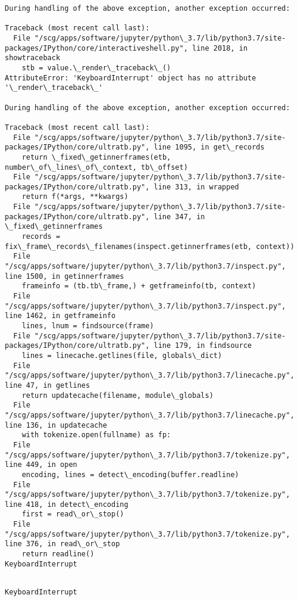 \documentclass[11pt]{article}
\begin{document}
\begin{Verbatim}[commandchars=\\\{\}]
During handling of the above exception, another exception occurred:

Traceback (most recent call last):
  File "/scg/apps/software/jupyter/python\_3.7/lib/python3.7/site-packages/IPython/core/interactiveshell.py", line 2018, in showtraceback
    stb = value.\_render\_traceback\_()
AttributeError: 'KeyboardInterrupt' object has no attribute '\_render\_traceback\_'

During handling of the above exception, another exception occurred:

Traceback (most recent call last):
  File "/scg/apps/software/jupyter/python\_3.7/lib/python3.7/site-packages/IPython/core/ultratb.py", line 1095, in get\_records
    return \_fixed\_getinnerframes(etb, number\_of\_lines\_of\_context, tb\_offset)
  File "/scg/apps/software/jupyter/python\_3.7/lib/python3.7/site-packages/IPython/core/ultratb.py", line 313, in wrapped
    return f(*args, **kwargs)
  File "/scg/apps/software/jupyter/python\_3.7/lib/python3.7/site-packages/IPython/core/ultratb.py", line 347, in \_fixed\_getinnerframes
    records = fix\_frame\_records\_filenames(inspect.getinnerframes(etb, context))
  File "/scg/apps/software/jupyter/python\_3.7/lib/python3.7/inspect.py", line 1500, in getinnerframes
    frameinfo = (tb.tb\_frame,) + getframeinfo(tb, context)
  File "/scg/apps/software/jupyter/python\_3.7/lib/python3.7/inspect.py", line 1462, in getframeinfo
    lines, lnum = findsource(frame)
  File "/scg/apps/software/jupyter/python\_3.7/lib/python3.7/site-packages/IPython/core/ultratb.py", line 179, in findsource
    lines = linecache.getlines(file, globals\_dict)
  File "/scg/apps/software/jupyter/python\_3.7/lib/python3.7/linecache.py", line 47, in getlines
    return updatecache(filename, module\_globals)
  File "/scg/apps/software/jupyter/python\_3.7/lib/python3.7/linecache.py", line 136, in updatecache
    with tokenize.open(fullname) as fp:
  File "/scg/apps/software/jupyter/python\_3.7/lib/python3.7/tokenize.py", line 449, in open
    encoding, lines = detect\_encoding(buffer.readline)
  File "/scg/apps/software/jupyter/python\_3.7/lib/python3.7/tokenize.py", line 418, in detect\_encoding
    first = read\_or\_stop()
  File "/scg/apps/software/jupyter/python\_3.7/lib/python3.7/tokenize.py", line 376, in read\_or\_stop
    return readline()
KeyboardInterrupt

    \end{Verbatim}

    \begin{Verbatim}[commandchars=\\\{\}]

KeyboardInterrupt


    \end{Verbatim}
\end{document}
